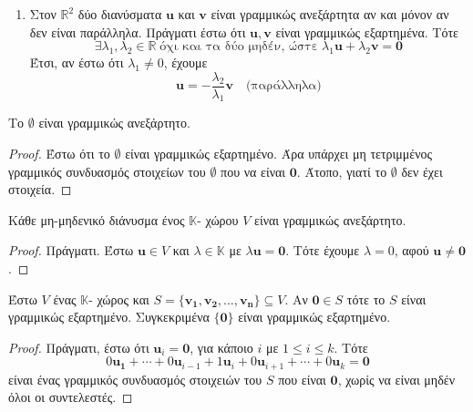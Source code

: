 \begin{examples}
\item {}
  \begin{enumerate}
    \item Στον $ \mathbb{R}^{2} $ δύο διανύσματα $ \mathbf{u} $ και $ \mathbf{v} $ 
      είναι γραμμικώς ανεξάρτητα αν και μόνον αν δεν είναι παράλληλα. Πράγματι 
      έστω ότι $ \mathbf{u}, \mathbf{v} $ είναι γραμμικώς εξαρτημένα. Τότε 
      \[
        \exists \lambda _{1}, \lambda _{2} \in \mathbb{R} \; 
        \text{όχι και τα δύο μηδέν, ώστε} 
        \; \lambda_{1} \mathbf{u} + \lambda_{2} \mathbf{v} = \mathbf{0} 
      \]
      Έτσι, αν έστω ότι $ \lambda_{1} \neq 0 $, έχουμε 
      \[
        \mathbf{u} = - \frac{\lambda _{2}}{\lambda _{1}} \mathbf{v} \quad  
        \text{(παράλληλα)}
      \] 
  \end{enumerate}
\end{examples}

\begin{prop}
  Το $ \emptyset $ είναι γραμμικώς ανεξάρτητο. 
\end{prop}
\begin{proof}
  Έστω ότι το $ \emptyset $ είναι γραμμικώς εξαρτημένο. Άρα υπάρχει μη τετριμμένος 
  γραμμικός συνδυασμός στοιχείων του $ \emptyset $ που να είναι 
  $ \mathbf{0} $. Άτοπο, γιατί το $ \emptyset $ δεν έχει στοιχεία.
\end{proof}

\begin{prop}
  Κάθε μη-μηδενικό διάνυσμα ένος $ \mathbb{K} $- χώρου $V$ είναι γραμμικώς 
  ανεξάρτητο.
\end{prop}
\begin{proof}
  Πράγματι. Έστω $ \mathbf{u} \in V $ και $ \lambda \in \mathbb{K} $ με 
  $ \lambda \mathbf{u} = \mathbf{0} $. Τότε έχουμε $ \lambda = 0 $, αφού 
  $ \mathbf{u} \neq \mathbf{0} $.
\end{proof}

\begin{prop}
  Έστω $V$ ένας $ \mathbb{K} $- χώρος και 
  $ S = \{ \mathbf{v_{1}}, \mathbf{v_{2}}, \ldots, \mathbf{v_{n}}  \} \subseteq V $.
  Αν $ \mathbf{0} \in S $ τότε το $S$ είναι γραμμικώς εξαρτημένο. Συγκεκριμένα 
  $ \{ \mathbf{0} \} $ είναι γραμμικώς εξαρτημένο.
\end{prop}
\begin{proof}
  Πράγματι, έστω ότι $ \mathbf{u}_{i} = \mathbf{0} $, για κάποιο $ i $ με 
  $ 1 \leq i \leq k $. Τότε
  \[
    0 \mathbf{u_{1}}+ \cdots + 0 \mathbf{u}_{i-1} + 1 \mathbf{u}_{i} + 0 
    \mathbf{u}_{i+1} + \cdots + 0 \mathbf{u}_{k} = \mathbf{0}  
  \]
  είναι ένας γραμμικός συνδυασμός στοιχειών του $S$ που είναι $ \mathbf{0} $, 
  χωρίς να είναι μηδέν όλοι οι συντελεστές.
\end{proof}



